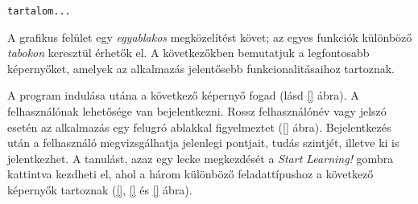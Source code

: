 \documentclass[a4paper]{article}
\begin{document}
\begin{lstlisting}
tartalom...
\end{lstlisting}
     
     A grafikus felület egy \emph{egyablakos} megközelítést követ; az egyes funkciók különböző \emph{tabokon} keresztül érhetők el. A következőkben bemutatjuk a legfontosabb képernyőket, amelyek az alkalmazás jelentősebb funkcionalitásaihoz tartoznak.
     
     A program indulása utána a következő képernyő fogad (lásd \ref{} ábra).     
     A felhasználónak lehetősége van bejelentkezni. Rossz felhasználónév vagy jelszó esetén az alkalmazás egy felugró ablakkal figyelmeztet (\ref{} ábra).
     Bejelentkezés után a felhasználó megvizsgálhatja jelenlegi pontjait, tudás szintjét, illetve ki is jelentkezhet.     
     A tanulást, azaz egy lecke megkezdését a \emph{Start Learning!} gombra kattintva kezdheti el, ahol a három különböző feladattípushoz a következő képernyők tartoznak (\ref{}, \ref{} és \ref{} ábra).
\end{document}
